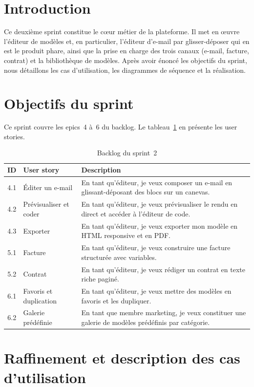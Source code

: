 \documentclass[12pt,a4paper,oneside]{report}
\begin{document}
\section*{Introduction}
Ce deuxième sprint constitue le c\oe{}ur métier de la plateforme. Il met en
\oe{}uvre l'éditeur de modèles et, en particulier, l'éditeur d'e-mail par
glisser-déposer qui en est le produit phare, ainsi que la prise en charge
des trois canaux (e-mail, facture, contrat) et la bibliothèque de
modèles. Après avoir énoncé les objectifs du sprint, nous détaillons les
cas d'utilisation, les diagrammes de séquence et la réalisation.

\section{Objectifs du sprint}
Ce sprint couvre les epics~4 à~6 du backlog. Le
tableau~\ref{tab:backlog-s2} en présente les user stories.

\begin{table}[H]
\centering
\caption{Backlog du sprint~2}
\label{tab:backlog-s2}
\small
\begin{tabularx}{\linewidth}{clX}
\toprule
\textbf{ID} & \textbf{User story} & \textbf{Description} \\
\midrule
4.1 & Éditer un e-mail & En tant qu'éditeur, je veux composer un e-mail en glissant-déposant des blocs sur un canevas. \\
4.2 & Prévisualiser et coder & En tant qu'éditeur, je veux prévisualiser le rendu en direct et accéder à l'éditeur de code. \\
4.3 & Exporter & En tant qu'éditeur, je veux exporter mon modèle en HTML responsive et en PDF. \\
5.1 & Facture & En tant qu'éditeur, je veux construire une facture structurée avec variables. \\
5.2 & Contrat & En tant qu'éditeur, je veux rédiger un contrat en texte riche paginé. \\
6.1 & Favoris et duplication & En tant qu'éditeur, je veux mettre des modèles en favoris et les dupliquer. \\
6.2 & Galerie prédéfinie & En tant que membre marketing, je veux constituer une galerie de modèles prédéfinis par catégorie. \\
\bottomrule
\end{tabularx}
\end{table}

\section{Raffinement et description des cas d'utilisation}
\end{document}
